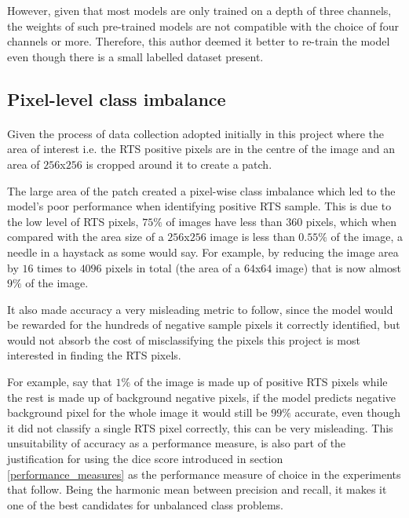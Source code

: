 However, given that most models are only trained on a depth of three channels, the weights of such pre-trained models are not compatible with the choice of four channels or more.
Therefore, this author deemed it better to re-train the model even though there is a small labelled dataset present.

\subsection{Pixel-level class imbalance} \label{class_imbalance}
\paragraph{}
Given the process of data collection adopted initially in this project where the area of interest i.e. the \gls{RTS} positive pixels are in the centre of the image and an area of $256$x$256$ is cropped around it to create a patch. 

The large area of the patch created a pixel-wise class imbalance which led to the model's poor performance when identifying positive \gls{RTS} sample. This is due to the low level of \gls{RTS} pixels, $75\%$ of images have less than $360$ pixels, which when compared with the area size of a $256$x$256$ image is less than $0.55\%$ of the image, a needle in a haystack as some would say. For example, by reducing the image area by $16$ times to $4096$ pixels in total (the area of a $64$x$64$ image) that is now almost $9\%$ of the image.

It also made accuracy a very misleading metric to follow, since the model would be rewarded for the hundreds of negative sample pixels it correctly identified, but would not absorb the cost of misclassifying the pixels this project is most interested in finding the \gls{RTS} pixels. 

For example, say that $1\%$ of the image is made up of positive \gls{RTS} pixels while the rest is made up of background negative pixels, if the model predicts negative background pixel for the whole image it would still be $99\%$ accurate, even though it did not classify a single \gls{RTS} pixel correctly, this can be very misleading.
This unsuitability of accuracy as a performance measure, is also part of the justification for using the dice score introduced in section \ref{performance_measures} as the performance measure of choice in the experiments that follow. Being the harmonic mean between precision and recall, it makes it one of the best candidates for unbalanced class problems.


